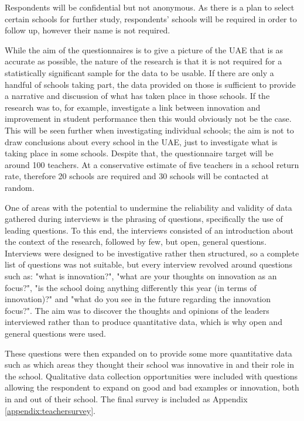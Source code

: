 Respondents will be confidential but not anonymous. As there is a plan to select certain schools for further study, respondents' schools will be required in order to follow up, however their name is not required. 

While the aim of the questionnaires is to give a picture of the UAE that is as accurate as possible, the nature of the research is that it is not required for a statistically significant sample for the data to be usable. If there are only a handful of schools taking part, the data provided on those is sufficient to provide a narrative and discussion of what has taken place in those schools. If the research was to, for example, investigate a link between innovation and improvement in student performance then this would obviously not be the case. This will be seen further when investigating individual schools; the aim is not to draw conclusions about every school in the UAE, just to investigate what is taking place in some schools.
Despite that, the questionnaire target will be around 100 teachers. At a conservative estimate of five teachers in a school return rate, therefore 20 schools are required and 30 schools will be contacted at random.

One of areas with the potential to undermine the reliability and validity of data gathered during interviews is the phrasing of questions, specifically the use of leading questions. To this end, the interviews consisted of an introduction about the context of the research, followed by few, but open, general questions. Interviews were designed to be investigative rather then structured, so a complete list of questions was not suitable, but every interview revolved around questions such as: "what is innovation?", "what are your thoughts on innovation as an focus?", "is the school doing anything differently this year (in terms of innovation)?" and "what do you see in the future regarding the innovation focus?". The aim was to discover the thoughts and opinions of the leaders interviewed rather than to produce quantitative data, which is why open and general questions were used. 

These questions were then expanded on to provide some more quantitative data such as which areas they thought their school was innovative in and their role in the school. Qualitative data collection opportunities were included with questions allowing the respondent to expand on good and bad examples or innovation, both in and out of their school.
The final survey is included as Appendix \ref{appendix:teachersurvey}.

